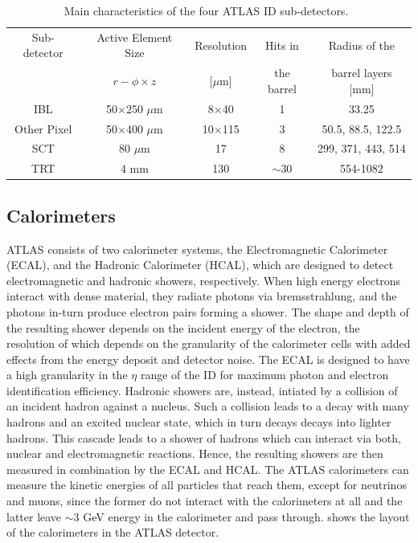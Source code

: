 \begin{table}[!ht]
    \centering
    \begin{tabular}{ccccc}
        \hline \hline
        Sub-detector & Active Element Size & Resolution & Hits in & Radius of the \\
         & $r-\phi \times z$ & [$\mu$m] & the barrel & barrel layers [mm] \\
         \hline
        IBL   & 50$\times$250 $\mu$m & 8$\times$40  & 1   & 33.25 \\
        Other Pixel & 50$\times$400 $\mu$m & 10$\times$115 & 3   & 50.5, 88.5, 122.5 \\
        SCT   & 80 $\mu$m          & 17            & 8   & 299, 371, 443, 514 \\
        TRT   & 4 mm               & 130           & $\sim$30 & 554-1082 \\
        \hline \hline
    \end{tabular}
    \caption{Main characteristics of the four ATLAS ID sub-detectors.~\cite{ATLAS-CONF-2014-047, ATL-INDET-PUB-2016-001}}
    \label{tab:id_chars}
\end{table}

\subsection{Calorimeters}
ATLAS consists of two calorimeter systems, the Electromagnetic Calorimeter (ECAL), and the Hadronic Calorimeter (HCAL), which are designed to detect electromagnetic and hadronic showers, respectively. When high energy electrons interact with dense material, they radiate photons via bremsstrahlung, and the photons in-turn produce electron pairs forming a shower. The shape and depth of the resulting shower depends on the incident energy of the electron, the resolution of which depends on the granularity of the calorimeter cells with added effects from the energy deposit and detector noise. The ECAL is designed to have a high granularity in the $\eta$ range of the ID for maximum photon and electron identification efficiency. Hadronic showers are, instead, intiated by a collision of an incident hadron against a nucleus. Such a collision leads to a decay with many hadrons and an excited nuclear state, which in turn decays decays into lighter hadrons. This cascade leads to a shower of hadrons which can interact via both, nuclear and electromagnetic reactions. Hence, the resulting showers are then measured in combination by the ECAL and HCAL. The ATLAS calorimeters can measure the kinetic energies of all particles that reach them, except for neutrinos and muons, since the former do not interact with the calorimeters at all and the latter leave $\sim$3 GeV energy in the calorimeter and pass through.  shows the layout of the calorimeters in the ATLAS detector. 

